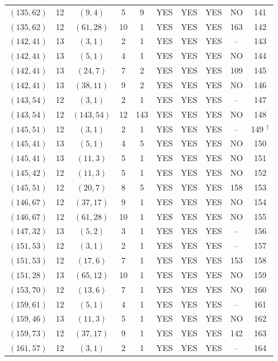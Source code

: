\begin{longtable}{|c|c|c|c|c|c|c|c|c|c|}
$(135, 62)$ & 12 & $(9, 4)$ & 5 & 9 & YES & YES & YES & NO & 141\\
$(135, 62)$ & 12 & $(61, 28)$ & 10 & 1 & YES & YES & YES & 163 & 142\\
$(142, 41)$ & 13 & $(3, 1)$ & 2 & 1 & YES & YES & YES & -- & 143\\
$(142, 41)$ & 13 & $(5, 1)$ & 4 & 1 & YES & YES & YES & NO & 144\\
$(142, 41)$ & 13 & $(24, 7)$ & 7 & 2 & YES & YES & YES & 109 & 145\\
$(142, 41)$ & 13 & $(38, 11)$ & 9 & 2 & YES & YES & YES & NO & 146\\
$(143, 54)$ & 12 & $(3, 1)$ & 2 & 1 & YES & YES & YES & -- & 147\\
$(143, 54)$ & 12 & $(143, 54)$ & 12 & 143 & YES & YES & YES & NO & 148\\
$(145, 51)$ & 12 & $(3, 1)$ & 2 & 1 & YES & YES & YES & -- & 149 ${}^\dagger$\\
$(145, 41)$ & 13 & $(5, 1)$ & 4 & 5 & YES & YES & YES & NO & 150\\
$(145, 41)$ & 13 & $(11, 3)$ & 5 & 1 & YES & YES & YES & NO & 151\\
$(145, 42)$ & 12 & $(11, 3)$ & 5 & 1 & YES & YES & YES & NO & 152\\
$(145, 51)$ & 12 & $(20, 7)$ & 8 & 5 & YES & YES & YES & 158 & 153\\
$(146, 67)$ & 12 & $(37, 17)$ & 9 & 1 & YES & YES & YES & NO & 154\\
$(146, 67)$ & 12 & $(61, 28)$ & 10 & 1 & YES & YES & YES & NO & 155\\
$(147, 32)$ & 13 & $(5, 2)$ & 3 & 1 & YES & YES & YES & -- & 156\\
$(151, 53)$ & 12 & $(3, 1)$ & 2 & 1 & YES & YES & YES & -- & 157\\
$(151, 53)$ & 12 & $(17, 6)$ & 7 & 1 & YES & YES & YES & 153 & 158\\
$(151, 28)$ & 13 & $(65, 12)$ & 10 & 1 & YES & YES & YES & NO & 159\\
$(153, 70)$ & 12 & $(13, 6)$ & 7 & 1 & YES & YES & YES & NO & 160\\
$(159, 61)$ & 12 & $(5, 1)$ & 4 & 1 & YES & YES & YES & -- & 161\\
$(159, 46)$ & 13 & $(11, 3)$ & 5 & 1 & YES & YES & YES & NO & 162\\
$(159, 73)$ & 12 & $(37, 17)$ & 9 & 1 & YES & YES & YES & 142 & 163\\
$(161, 57)$ & 12 & $(3, 1)$ & 2 & 1 & YES & YES & YES & -- & 164\\

\end{longtable}
